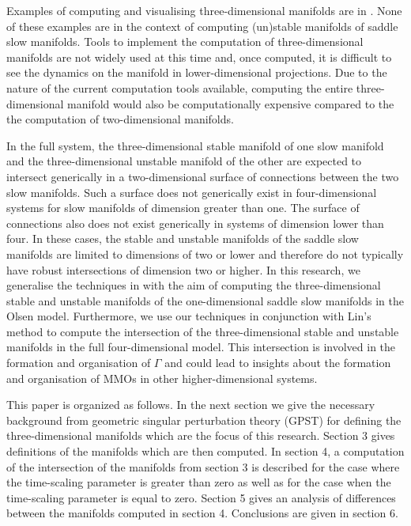 \documentclass{ws-ijbc}
\begin{document}
Examples of computing and visualising three-dimensional manifolds are in \cite{Initial_conditions_volume, Invariant_tori_again, Invariant_tori}.  None of these examples are in the context of computing (un)stable manifolds of saddle slow manifolds.  Tools to implement the computation of three-dimensional manifolds are not widely used at this time and, once computed, it is difficult to see the dynamics on the manifold in lower-dimensional projections.  Due to the nature of the current computation tools available, computing the entire three-dimensional manifold would also be computationally expensive compared to the the computation of two-dimensional manifolds.

In the full system, the three-dimensional stable manifold of one slow manifold and the three-dimensional unstable manifold of the other are expected to intersect generically in a two-dimensional surface of connections between the two slow manifolds.  Such a surface does not generically exist in four-dimensional systems for slow manifolds of dimension greater than one.  The surface of connections also does not exist generically in systems of dimension lower than four.  In these cases, the stable and unstable manifolds of the saddle slow manifolds are limited to dimensions of two or lower and therefore do not typically have robust intersections of dimension two or higher.  In this research, we generalise the techniques in \cite{Saeed_Paper} with the aim of computing the three-dimensional stable and unstable manifolds of the one-dimensional saddle slow manifolds in the Olsen model.  Furthermore, we use our techniques in conjunction with Lin's method to compute the intersection of the three-dimensional stable and unstable manifolds in the full four-dimensional model.  This intersection is involved in the formation and organisation of $\Gamma$ and could lead to insights about the formation and organisation of MMOs in other higher-dimensional systems.

This paper is organized as follows.  In the next section we give the necessary background from geometric singular perturbation theory (GPST) for defining the three-dimensional manifolds which are the focus of this research.  Section 3 gives definitions of the manifolds which are then computed.  In section 4, a computation of the intersection of the manifolds from section 3 is described for the case where the time-scaling parameter is greater than zero as well as for the case when the time-scaling parameter is equal to zero.  Section 5 gives an analysis of differences between the manifolds computed in section 4.  Conclusions are given in section 6.
\end{document}
